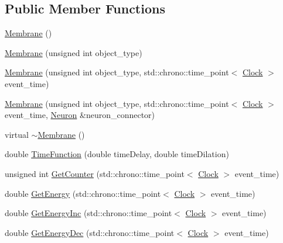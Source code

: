 \subsection*{Public Member Functions}
\begin{DoxyCompactItemize}
\item 
\mbox{\hyperlink{classMembrane_ae3db1e55d9a535226bfd41c2a9ac1f0c}{Membrane}} ()
\item 
\mbox{\hyperlink{classMembrane_a9e45fcb5a4e791f2697fce4d9fa78a3f}{Membrane}} (unsigned int object\+\_\+type)
\item 
\mbox{\hyperlink{classMembrane_afeb8292866a69bdc2b9be6dcd902b519}{Membrane}} (unsigned int object\+\_\+type, std\+::chrono\+::time\+\_\+point$<$ \mbox{\hyperlink{universe_8h_a0ef8d951d1ca5ab3cfaf7ab4c7a6fd80}{Clock}} $>$ event\+\_\+time)
\item 
\mbox{\hyperlink{classMembrane_a8d61894d90a7f63e427cd8b1a5eca380}{Membrane}} (unsigned int object\+\_\+type, std\+::chrono\+::time\+\_\+point$<$ \mbox{\hyperlink{universe_8h_a0ef8d951d1ca5ab3cfaf7ab4c7a6fd80}{Clock}} $>$ event\+\_\+time, \mbox{\hyperlink{classNeuron}{Neuron}} \&neuron\+\_\+connector)
\item 
virtual \mbox{\hyperlink{classMembrane_a8765daf8038c1e992e3ea3752db0042f}{$\sim$\+Membrane}} ()
\item 
double \mbox{\hyperlink{classMembrane_a8c3593b0747495c412bf2d99b7b10104}{Time\+Function}} (double time\+Delay, double time\+Dilation)
\item 
unsigned int \mbox{\hyperlink{classMembrane_a85f8b2633ff32f79b6fbb466ce690858}{Get\+Counter}} (std\+::chrono\+::time\+\_\+point$<$ \mbox{\hyperlink{universe_8h_a0ef8d951d1ca5ab3cfaf7ab4c7a6fd80}{Clock}} $>$ event\+\_\+time)
\item 
double \mbox{\hyperlink{classMembrane_a50d39c596daa7af8da7dd7215d3a32ba}{Get\+Energy}} (std\+::chrono\+::time\+\_\+point$<$ \mbox{\hyperlink{universe_8h_a0ef8d951d1ca5ab3cfaf7ab4c7a6fd80}{Clock}} $>$ event\+\_\+time)
\item 
double \mbox{\hyperlink{classMembrane_a00e038f0023186139467d490c6cd38a3}{Get\+Energy\+Inc}} (std\+::chrono\+::time\+\_\+point$<$ \mbox{\hyperlink{universe_8h_a0ef8d951d1ca5ab3cfaf7ab4c7a6fd80}{Clock}} $>$ event\+\_\+time)
\item 
double \mbox{\hyperlink{classMembrane_a874068c028004d4dde7ec41d999872eb}{Get\+Energy\+Dec}} (std\+::chrono\+::time\+\_\+point$<$ \mbox{\hyperlink{universe_8h_a0ef8d951d1ca5ab3cfaf7ab4c7a6fd80}{Clock}} $>$ event\+\_\+time)
\item 

\end{DoxyCompactItemize}
